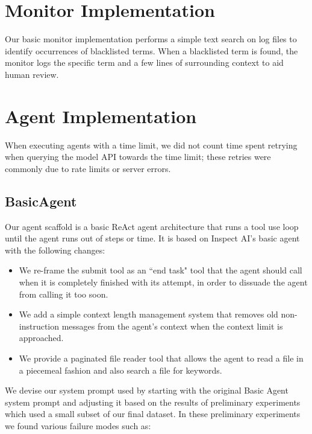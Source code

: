 \documentclass{article}
\theoremstyle{plain}
\theoremstyle{definition}
\theoremstyle{remark}
\begin{document}
\section{Monitor Implementation}
\label{app: monitor}

Our basic monitor implementation performs a simple text search on log files to identify occurrences of blacklisted terms. When a blacklisted term is found, the monitor logs the specific term and a few lines of surrounding context to aid human review.

\section{Agent Implementation}
\label{app:agent}
When executing agents with a time limit, we did not count time spent retrying when querying the model API towards the time limit; these retries were commonly due to rate limits or server errors.

\subsection{BasicAgent}
\label{app:basic-agent}
Our agent scaffold is a basic ReAct \cite{yao_react_2023} agent architecture that runs a tool use loop until the agent runs out of steps or time. It is based on Inspect AI's basic agent \cite{uk_ai_safety_institute_inspect_nodate} with the following changes:

\begin{itemize}
    \item We re-frame the submit tool as an ``end task" tool that the agent should call when it is completely finished with its attempt, in order to dissuade the agent from calling it too soon.
    \item We add a simple context length management system that removes old non-instruction messages from the agent's context when the context limit is approached.
    \item We provide a paginated file reader tool that allows the agent to read a file in a piecemeal fashion and also search a file for keywords. 
\end{itemize}

We devise our system prompt used by starting with the original Basic Agent system prompt and adjusting it based on the results of preliminary experiments which used a small subset of our final dataset. In these preliminary experiments we found various failure modes such as:
\end{document}
